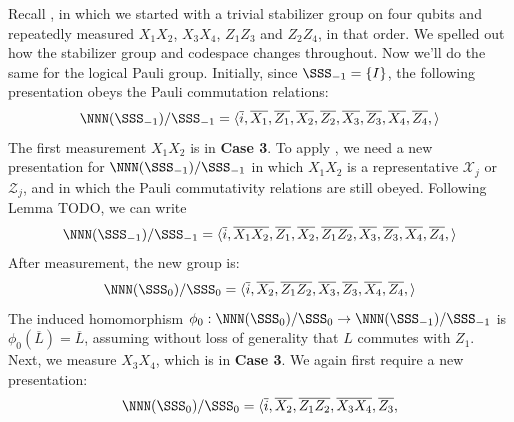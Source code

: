 \begin{example}\label{ex:bacon_shor_logical_pauli_group_updates}
    Recall , in which we started with a trivial stabilizer group on four qubits and repeatedly measured $X_1 X_2$, $X_3 X_4$, $Z_1 Z_3$ and $Z_2 Z_4$, in that order.
    We spelled out how the stabilizer group and codespace changes throughout.
    Now we'll do the same for the logical Pauli group.
    Initially, since $\SSS_{-1} = \{I\}$, the following presentation obeys the Pauli commutation relations:
    \begin{equation}
        \NNN(\SSS_{-1})/\SSS_{-1} = \langle
            \overline{i},
            \overline{X_1}, \overline{Z_1},
            \overline{X_2}, \overline{Z_2},
            \overline{X_3}, \overline{Z_3},
            \overline{X_4}, \overline{Z_4},
        \rangle
    \end{equation}
    The first measurement $X_1 X_2$ is in \textbf{Case 3}.
    To apply , we need a new presentation for $\NNN(\SSS_{-1})/\SSS_{-1}$ in which $X_1 X_2$ is a representative $\mathcal{X}_j$ or $\mathcal{Z}_j$, and in which the Pauli commutativity relations are still obeyed.
    Following Lemma TODO, we can write
    \begin{equation}
        \NNN(\SSS_{-1})/\SSS_{-1} = \langle
        \overline{i},
        \overline{X_1 X_2}, \overline{Z_1},
        \overline{X_2}, \overline{Z_1 Z_2},
        \overline{X_3}, \overline{Z_3},
        \overline{X_4}, \overline{Z_4},
        \rangle
    \end{equation}
    After measurement, the new group is:
    \begin{equation}
        \NNN(\SSS_{0})/\SSS_{0} = \langle
        \overline{i},
        \overline{X_2}, \overline{Z_1 Z_2},
        \overline{X_3}, \overline{Z_3},
        \overline{X_4}, \overline{Z_4},
        \rangle
    \end{equation}
    The induced homomorphism $\phi_0: \NNN(\SSS_{0})/\SSS_{0} \to \NNN(\SSS_{-1})/\SSS_{-1}$ is $\phi_0(\overline{L}) = \overline{L}$, assuming without loss of generality that $L$ commutes with $Z_1$.
    Next, we measure $X_3 X_4$, which is in \textbf{Case 3}.
    We again first require a new presentation:
    \begin{equation}
        \NNN(\SSS_{0})/\SSS_{0} = \langle
            \overline{i},
            \overline{X_2}, \overline{Z_1 Z_2},
            \overline{X_3 X_4}, \overline{Z_3},

\end{equation}
\end{example}
